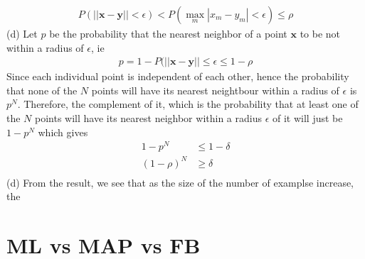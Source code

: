 \documentclass[11pt]{article}
\begin{document}
\begin{align}
P(||\mathbf{x}-\mathbf{y}||<\epsilon)< P(\max_m|x_m-y_m|<\epsilon)\leq \rho
\end{align}
(d) Let $p$ be the probability that the nearest neighbor of a point $\mathbf{x}$ to be not within a radius of $\epsilon$, ie
\begin{align}
p=1-P(||\mathbf{x}-\mathbf{y}||\leq\epsilon\leq1-\rho
\end{align}
Since each individual point is independent of each other, hence the probability that none of the $N$ points will have its nearest neightbour within a radius of $\epsilon$ is $p^N$. Therefore, the complement of it, which is the probability that at least one of the $N$ points will have its nearest neighbor within a radius $\epsilon$ of it will just be $1-p^N$ which gives
\begin{align}
1-p^N&\leq 1-\delta\\
(1-\rho)^N&\geq \delta\\
\end{align}
(d) From the result, we see that as the size of the number of examplse increase, the 
\section{ML vs MAP vs FB}
\end{document}

